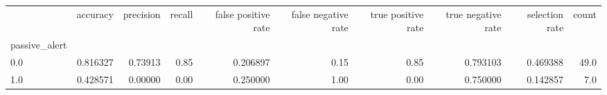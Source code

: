 \begin{tabular}{lrrrrrrrrr}
\toprule
{} &  accuracy &  precision &  recall &  false positive rate &  false negative rate &  true positive rate &  true negative rate &  selection rate &  count \\
passive\_alert &           &            &         &                      &                      &                     &                     &                 &        \\
\midrule
0.0           &  0.816327 &    0.73913 &    0.85 &             0.206897 &                 0.15 &                0.85 &            0.793103 &        0.469388 &   49.0 \\
1.0           &  0.428571 &    0.00000 &    0.00 &             0.250000 &                 1.00 &                0.00 &            0.750000 &        0.142857 &    7.0 \\
\bottomrule
\end{tabular}
